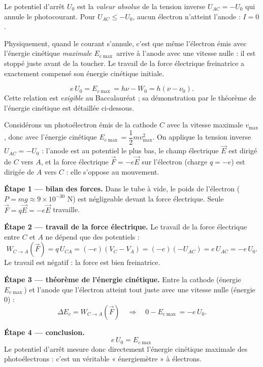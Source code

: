\documentclass[11pt]{article}
\newcommand{\cle}[1]{{\popxbold\color{popdark}#1}}
\newcounter{popsec}
\newcounter{popsub}
\newcommand{\courssub}[1]{%
  \stepcounter{popsub}%
  \par\vspace{9pt}\noindent{\popxbold\fontsize{11.5}{13}\selectfont\color{popink}{\color{poporange}\thepopsec.\thepopsub}\hspace{6pt}#1}\par\nopagebreak\vspace{4pt}
}
\begin{document}
\courssub{Potentiel d'arrêt $U_0$}

\begin{definition}
Le \cle{potentiel d'arrêt} $U_0$ est la \emph{valeur absolue} de la tension inverse $U_{AC} = -U_0$ qui annule le photocourant. Pour $U_{AC} \leq -U_0$, aucun électron n'atteint l'anode : $I = 0$.
\end{definition}

Physiquement, quand le courant s'annule, c'est que même l'électron émis avec l'énergie cinétique \emph{maximale} $E_{c\max}$ arrive à l'anode avec une vitesse nulle : il est stoppé juste avant de la toucher. Le travail de la force électrique freinatrice a exactement compensé son énergie cinétique initiale.

\begin{propriete}
\[ e\,U_0 = E_{c\max} = h\nu - W_0 = h(\nu - \nu_0). \]
Cette relation est \emph{exigible} au Baccalauréat ; sa démonstration par le théorème de l'énergie cinétique est détaillée ci-dessous.
\end{propriete}

\begin{experience}[Démonstration guidée : $eU_0 = E_{c\max}$]
Considérons un photoélectron émis de la cathode $C$ avec la vitesse maximale $v_{\max}$, donc avec l'énergie cinétique $E_{c\max} = \dfrac{1}{2} m v_{\max}^2$. On applique la tension inverse $U_{AC} = -U_0$ : l'anode est au potentiel le plus bas, le champ électrique $\vec{E}$ est dirigé de $C$ vers $A$, et la force électrique $\vec{F} = -e\vec{E}$ sur l'électron (charge $q = -e$) est dirigée de $A$ vers $C$ : elle s'oppose au mouvement.

\textbf{Étape 1 — bilan des forces.} Dans le tube à vide, le poids de l'électron ($P = mg \approx 9 \times 10^{-30}$ N) est négligeable devant la force électrique. Seule $\vec{F} = q\vec{E} = -e\vec{E}$ travaille.

\textbf{Étape 2 — travail de la force électrique.} Le travail de la force électrique entre $C$ et $A$ ne dépend que des potentiels :
\[ W_{C \to A}(\vec{F}) = q\,U_{CA} = (-e)(V_C - V_A) = (-e)(-U_{AC}) = e\,U_{AC} = -e\,U_0. \]
Le travail est négatif : la force est bien freinatrice.

\textbf{Étape 3 — théorème de l'énergie cinétique.} Entre la cathode (énergie $E_{c\max}$) et l'anode que l'électron atteint tout juste avec une vitesse nulle (énergie $0$) :
\[ \Delta E_c = W_{C \to A}(\vec{F}) \quad\Longrightarrow\quad 0 - E_{c\max} = -e\,U_0. \]

\textbf{Étape 4 — conclusion.}
\[ \boxed{\; e\,U_0 = E_{c\max} \;} \]
Le potentiel d'arrêt mesure donc directement l'énergie cinétique maximale des photoélectrons : c'est un véritable « énergiemètre » à électrons.
\end{experience}
\end{document}
